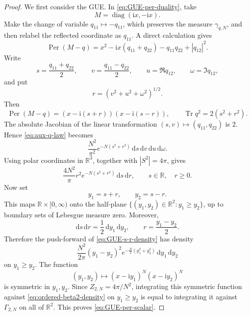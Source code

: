 \documentclass[11pt,reqno]{amsart}
\numberwithin{equation}{section}
\theoremstyle{definition}
\theoremstyle{remark}
\DeclareMathOperator{\Per}{Per}
\DeclareMathOperator{\Tr}{Tr}
\DeclareMathOperator{\diag}{diag}
\newcommand{\R}{\mathbb R}
\newcommand{\1}{\mathbf 1}
\newcommand{\dd}{\mathrm d}
\newcommand{\ii}{\mathrm i}
\begin{document}
\begin{proof}
We first consider the GUE.  In \eqref{eq:GUE-per-duality}, take
\[
  M=\diag(\ii x,-\ii x).
\]
Make the change of variable \(q_{11}\mapsto-q_{11}\), which preserves the
measure \(\gamma_{q,N}\), and then relabel the reflected coordinate as
\(q_{11}\).  A direct calculation gives
\[
  \Per(M-q)
  =
  x^2-\ii x(q_{11}+q_{22})-q_{11}q_{22}+|q_{12}|^2.
\]
Write
\[
  s=\frac{q_{11}+q_{22}}2,
  \qquad
  v=\frac{q_{11}-q_{22}}2,
  \qquad
  u=\Re q_{12},
  \qquad
  \omega=\Im q_{12},
\]
and put
\[
  r=(v^2+u^2+\omega^2)^{1/2}.
\]
Then
\[
  \Per(M-q)
  =
  (x-\ii(s+r))(x-\ii(s-r)),
  \qquad
  \Tr q^2=2(s^2+r^2).
\]
The absolute Jacobian of the linear transformation
\((s,v)\mapsto(q_{11},q_{22})\) is \(2\).  Hence
\eqref{eq:aux-q-law} becomes
\[
  \frac{N^2}{\pi^2}e^{-N(s^2+r^2)}
  \,\dd s\,\dd v\,\dd u\,\dd\omega.
\]
Using polar coordinates in \(\R^3\), together with \(|S^2|=4\pi\), gives
\begin{equation}\label{eq:GUE-s-r-density}
  \frac{4N^2}{\pi}r^2e^{-N(s^2+r^2)}\,\dd s\,\dd r,
  \qquad s\in\R,\quad r\ge0.
\end{equation}
Now set
\[
  y_1=s+r,
  \qquad
  y_2=s-r.
\]
This maps \(\R\times[0,\infty)\) onto the half-plane
\(\{(y_1,y_2)\in\R^2:y_1\ge y_2\}\), up to boundary sets of Lebesgue
measure zero.  Moreover,
\[
  \dd s\,\dd r=\frac12\,\dd y_1\,\dd y_2,
  \qquad
  r=\frac{y_1-y_2}{2}.
\]
Therefore the push-forward of \eqref{eq:GUE-s-r-density} has density
\begin{equation}\label{eq:ordered-beta2-density}
  \frac{N^2}{2\pi}(y_1-y_2)^2
  e^{-\frac N2(y_1^2+y_2^2)}\,\dd y_1\,\dd y_2
\end{equation}
on \(y_1\ge y_2\).  The function
\[
  (y_1,y_2)\longmapsto
  (x-\ii y_1)^N(x-\ii y_2)^N
\]
is symmetric in \(y_1,y_2\).  Since \(Z_{2,N}=4\pi/N^2\), integrating
this symmetric function against \eqref{eq:ordered-beta2-density} on
\(y_1\ge y_2\) is equal to integrating it against \(\Gamma_{2,N}\) on
all of \(\R^2\).  This proves \eqref{eq:GUE-per-scalar}.


\end{proof}
\end{document}
